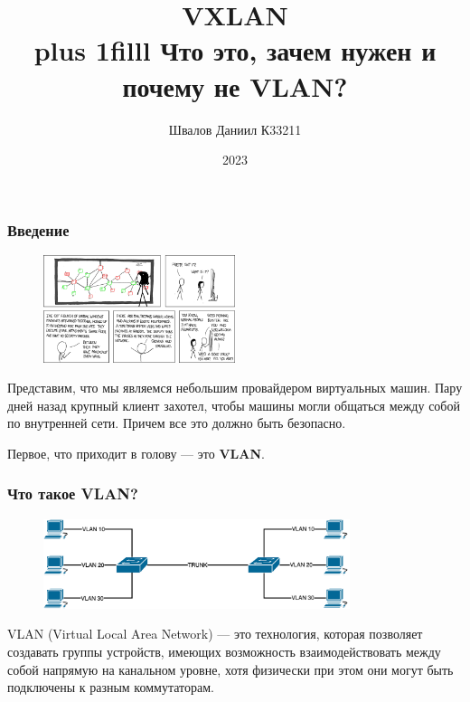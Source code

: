 \documentclass[aspectratio=169]{beamer}
\title{
  \huge{VXLAN} \\
  \vskip0pt plus 1filll
  \large{Что это, зачем нужен и почему не VLAN?}
}
\author{Швалов Даниил К33211}
\institute{Университет ИТМО}
\date{2023}
\begin{document}
\def\labelitemi{---}

\frame{\titlepage}

\begin{frame}
  \frametitle{Введение}

  \begin{figure}[H]
    \centering
    \includegraphics[width=0.5\textwidth]{images/xkcd.png}
  \end{figure}

  Представим, что мы являемся небольшим провайдером виртуальных машин. Пару дней
  назад крупный клиент захотел, чтобы машины могли общаться между собой по
  внутренней сети. Причем все это должно быть безопасно.

  \vspace*{1em}

  Первое, что приходит в голову --- это \textbf{VLAN}.
\end{frame}

\begin{frame}
  \frametitle{Что такое VLAN?}

  \begin{figure}[H]
    \centering
    \includegraphics[width=0.8\textwidth]{images/vlan.png}
  \end{figure}

  \vspace*{1em}

  VLAN (Virtual Local Area Network) --- это технология, которая позволяет
  создавать группы устройств, имеющих возможность взаимодействовать между собой
  напрямую на канальном уровне, хотя физически при этом они могут быть подключены
  к разным коммутаторам.
\end{frame}
\end{document}
